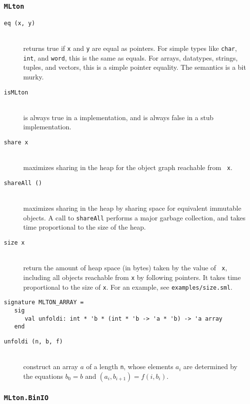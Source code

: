 \subsubsection{{\tt MLton}}

\newcommand{\entry}[1]{\item[\tt #1]\hspace{1in}\\}
\begin{description}

\entry{eq (x, y)}
returns true if {\tt x} and {\tt y} are equal as pointers.  For simple
types like {\tt char}, {\tt int}, and {\tt word}, this is the same as
equals.  For arrays, datatypes, strings, tuples, and vectors, this is
a simple pointer equality.  The semantics is a bit murky.

\entry{isMLton}
is always true in a {\mlton} implementation, and is always false in a
stub implementation.

\entry{share x}
maximizes sharing in the heap for the object graph reachable from {\tt
x}.

\entry{shareAll ()}
maximizes sharing in the heap by sharing space for equivalent
immutable objects.  A call to {\tt shareAll} performs a major garbage
collection, and takes time proportional to the size of the heap.

\entry{size x}
return the amount of heap space (in bytes) taken by the value of {\tt
x}, including all objects reachable from {\tt x} by following
pointers.  It takes time proportional to the size of {\tt x}.  For an
example, see {\tt examples/size.sml}.

\end{description}


\begin{verbatim}
signature MLTON_ARRAY =
   sig
      val unfoldi: int * 'b * (int * 'b -> 'a * 'b) -> 'a array
   end
\end{verbatim}

\begin{description}

\entry{unfoldi (n, b, f)}
construct an array $a$ of a length {\tt n}, whose elements $a_i$ are determined
by the equations $b_0 = b$ and $(a_i, b_{i+1}) = f (i, b_i)$.

\end{description}
%
\subsubsection{{\tt MLton.BinIO}}

